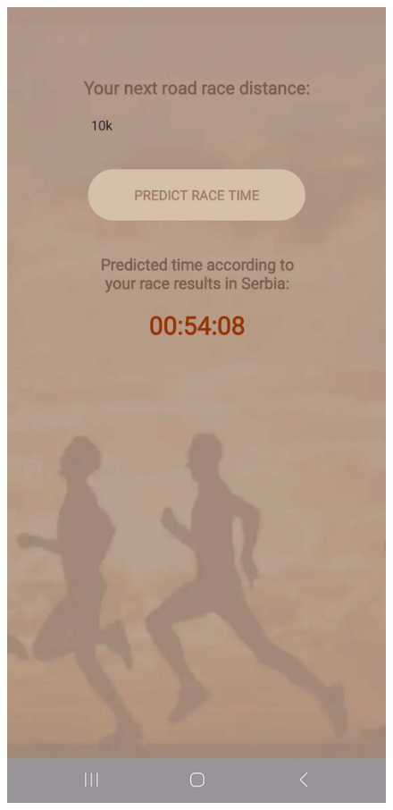 \documentclass[12pt,oneside]{memoir}
\begin{document}
\begin{figure}[H]
\begin{minipage}{0.27\textwidth}
  \end{minipage}
  \hfill
  \begin{minipage}{0.27\textwidth}
    \centering
    \includegraphics[width=\textwidth]{assets/pictures/app_screenshots/race_prediction_1.jpg}

\end{minipage}
\end{figure}
\end{document}
